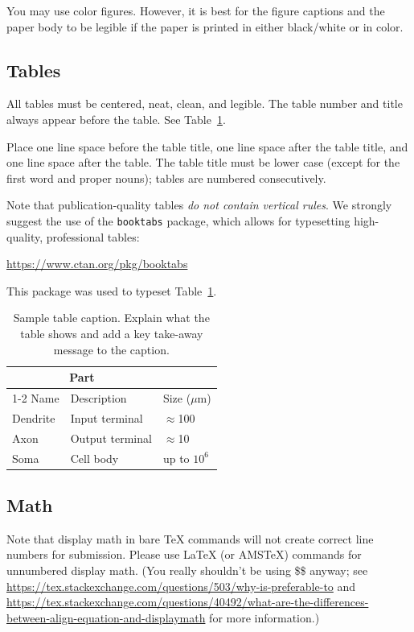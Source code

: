 \documentclass{article}
\begin{document}
You may use color figures.  However, it is best for the figure captions and the
paper body to be legible if the paper is printed in either black/white or in
color.


\subsection{Tables}


All tables must be centered, neat, clean, and legible.  The table number and
title always appear before the table.  See Table~\ref{sample-table}.


Place one line space before the table title, one line space after the
table title, and one line space after the table. The table title must
be lower case (except for the first word and proper nouns); tables are
numbered consecutively.


Note that publication-quality tables \emph{do not contain vertical rules}. We
strongly suggest the use of the \verb+booktabs+ package, which allows for
typesetting high-quality, professional tables:
\begin{center}
  \url{https://www.ctan.org/pkg/booktabs}
\end{center}
This package was used to typeset Table~\ref{sample-table}.


\begin{table}
  \caption{Sample table caption. Explain what the table shows and add a key take-away message to the caption.}
  \label{sample-table}
  \centering
  \begin{tabular}{lll}
    \toprule
    \multicolumn{2}{c}{Part}                   \\
    \cmidrule(r){1-2}
    Name     & Description     & Size ($\mu$m) \\
    \midrule
    Dendrite & Input terminal  & $\approx$100     \\
    Axon     & Output terminal & $\approx$10      \\
    Soma     & Cell body       & up to $10^6$  \\
    \bottomrule
  \end{tabular}
\end{table}

\subsection{Math}
Note that display math in bare TeX commands will not create correct line numbers for submission. Please use LaTeX (or AMSTeX) commands for unnumbered display math. (You really shouldn't be using \$\$ anyway; see \url{https://tex.stackexchange.com/questions/503/why-is-preferable-to} and \url{https://tex.stackexchange.com/questions/40492/what-are-the-differences-between-align-equation-and-displaymath} for more information.)
\end{document}
